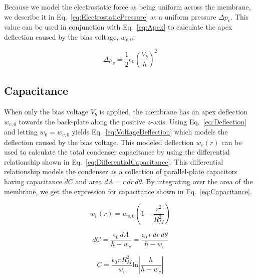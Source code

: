 \documentclass[journal]{IEEEtran}
\begin{document}
Because we model the electrostatic force as being uniform across the membrane, we describe it in Eq.~\ref{eq:ElectrostaticPressure}\supercite{aip} as a uniform pressure $\Delta p_v$. This value can be used in conjunction with Eq.~\ref{eq:Apex} to calculate the apex deflection caused by the bias voltage, $w_{v,0}$.

\begin{figure}[ht]
	\begin{equation}
		\Delta p_v = \frac{1}{2}\epsilon_0\left(\frac{V_b}{h}\right)^2
		\label{eq:ElectrostaticPressure}
	\end{equation}
\end{figure}

\subsection{Capacitance}

When only the bias voltage $V_b$ is applied, the membrane has an apex deflection $w_{v,0}$ towards the back-plate along the positive $z$-axis. Using Eq.~\ref{eq:Deflection} and letting $w_0=w_{v,0}$ yields Eq.~\ref{eq:VoltageDeflection} which models the deflection caused by the bias voltage. This modeled deflection $w_v(r)$ can be used to calculate the total condenser capacitance by using the differential relationship shown in Eq.~\ref{eq:DifferentialCapacitance}. This differential relationship models the condenser as a collection of parallel-plate capacitors having capacitance $dC$ and area $dA=r\,dr\,d\theta$. By integrating over the area of the membrane, we get the expression for capacitance shown in Eq.~\ref{eq:Capacitance}.

\begin{figure}[ht]
	\begin{equation}
		w_v(r) = w_{v,0}\left(1-\frac{r^2}{R_M^2}\right)
		\label{eq:VoltageDeflection}
	\end{equation}
	
	\begin{equation}
		dC = \frac{\epsilon_0\,dA}{h-w_v} = \frac{\epsilon_0\,r\,dr\,d\theta}{h-w_v}
		\label{eq:DifferentialCapacitance}
	\end{equation}

	\begin{equation}
		C = \frac{\epsilon_0\pi R_M^2}{w_v} \mathrm{ln}\left|\frac{h}{h-w_v}\right|
		\label{eq:Capacitance}
	\end{equation}
\end{figure}
\end{document}

